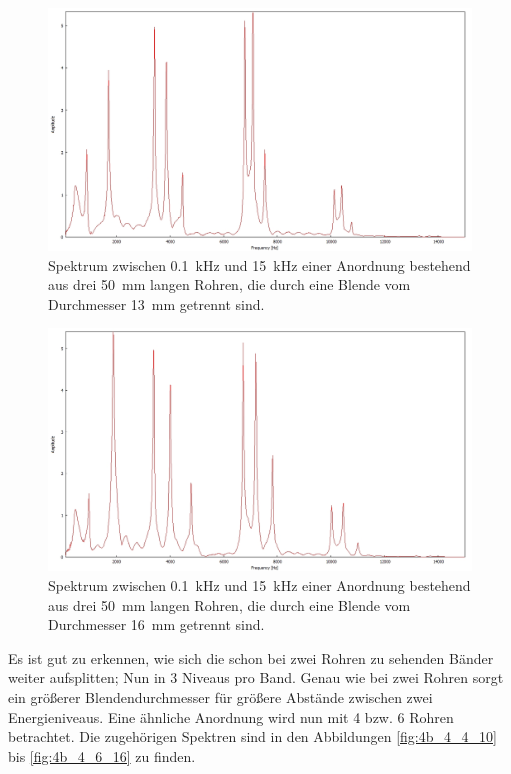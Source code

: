 \begin{figure}
\centering
\includegraphics[width=\textwidth]{content/messungen/Chapter4b/4b_4_3_13.jpg}
\caption{Spektrum zwischen 0.1~kHz und 15~kHz einer Anordnung bestehend aus drei 50~mm langen Rohren, die durch eine Blende vom Durchmesser 13~mm getrennt sind.}
\label{fig:4b_4_3_13}
\end{figure}
\begin{figure}
\centering
\includegraphics[width=\textwidth]{content/messungen/Chapter4b/4b_4_3_16.jpg}
\caption{Spektrum zwischen 0.1~kHz und 15~kHz einer Anordnung bestehend aus drei 50~mm langen Rohren, die durch eine Blende vom Durchmesser 16~mm getrennt sind.}
\label{fig:4b_4_3_16}
\end{figure}
Es ist gut zu erkennen, wie sich die schon bei zwei Rohren zu sehenden Bänder weiter aufsplitten; Nun in 3 Niveaus pro Band.
Genau wie bei zwei Rohren sorgt ein größerer Blendendurchmesser für größere Abstände zwischen zwei Energieniveaus.
Eine ähnliche Anordnung wird nun mit 4 bzw. 6 Rohren betrachtet.
Die zugehörigen Spektren sind in den Abbildungen \ref{fig:4b_4_4_10} bis \ref{fig:4b_4_6_16} zu finden.
